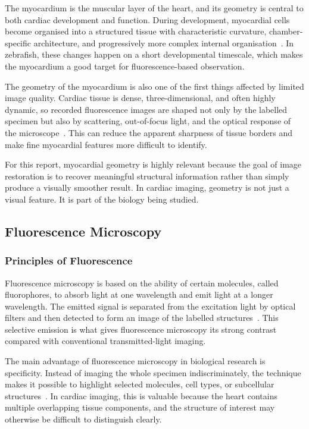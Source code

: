 The myocardium is the muscular layer of the heart, and its geometry is central to both cardiac development and function. During development, myocardial cells become organised into a structured tissue with characteristic curvature, chamber-specific architecture, and progressively more complex internal organisation~\cite{...}. In zebrafish, these changes happen on a short developmental timescale, which makes the myocardium a good target for fluorescence-based observation.

The geometry of the myocardium is also one of the first things affected by limited image quality. Cardiac tissue is dense, three-dimensional, and often highly dynamic, so recorded fluorescence images are shaped not only by the labelled specimen but also by scattering, out-of-focus light, and the optical response of the microscope~\cite{...}. This can reduce the apparent sharpness of tissue borders and make fine myocardial features more difficult to identify.

For this report, myocardial geometry is highly relevant because the goal of image restoration is to recover meaningful structural information rather than simply produce a visually smoother result. In cardiac imaging, geometry is not just a visual feature. It is part of the biology being studied.

\subsection{Fluorescence Microscopy}

\subsubsection{Principles of Fluorescence}

Fluorescence microscopy is based on the ability of certain molecules, called fluorophores, to absorb light at one wavelength and emit light at a longer wavelength. The emitted signal is separated from the excitation light by optical filters and then detected to form an image of the labelled structures~\cite{...}. This selective emission is what gives fluorescence microscopy its strong contrast compared with conventional transmitted-light imaging.

The main advantage of fluorescence microscopy in biological research is specificity. Instead of imaging the whole specimen indiscriminately, the technique makes it possible to highlight selected molecules, cell types, or subcellular structures~\cite{...}. In cardiac imaging, this is valuable because the heart contains multiple overlapping tissue components, and the structure of interest may otherwise be difficult to distinguish clearly.

